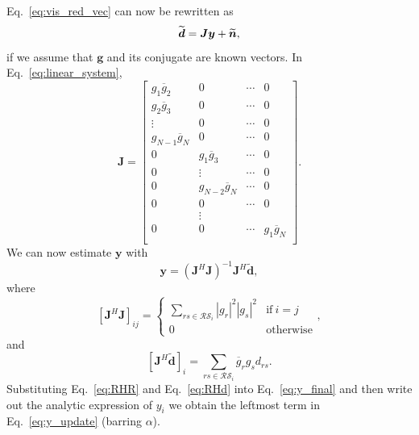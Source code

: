 \documentclass[useAMS,usenatbib]{mn2e}
\newcommand{\bn}{\bmath{n}}
\newcommand{\conj}[1]{\overline{#1}}
\begin{document}
Eq.~\eqref{eq:vis_red_vec} can now be rewritten as 
\begin{equation}
\label{eq:linear_system}
\widetilde{\boldsymbol{d}} = \boldsymbol{J}\boldsymbol{y} + \widetilde{\bn}, 
\end{equation}
if we assume that $\boldsymbol{g}$ and its conjugate are known vectors. In Eq.~\eqref{eq:linear_system},
\begin{equation}
\boldsymbol{J} = 
\begin{bmatrix}
g_1\conj{g}_2 & 0 & \cdots & 0\\
g_2\conj{g}_3 & 0 & \cdots & 0\\
\vdots & 0 & \cdots & 0\\
g_{N-1}\conj{g}_N & 0 & \cdots & 0\\
0 & g_1\conj{g}_3 & \cdots & 0\\
0 & \vdots & \cdots & 0\\
0 & g_{N-2}\conj{g}_N & \cdots & 0\\
0 & 0 & \cdots & 0\\
  & \vdots & \\
0 & 0 & \cdots & g_1\conj{g}_N\\  
\end{bmatrix}.
\end{equation}
We can now estimate $\boldsymbol{y}$ with
\begin{equation}
\label{eq:y_final}
\boldsymbol{y} = (\boldsymbol{J}^H\boldsymbol{J})^{-1}\boldsymbol{J}^H\widetilde{\boldsymbol{d}}, 
\end{equation}
where 
\begin{equation}
\label{eq:RHR}
[\boldsymbol{J}^H\boldsymbol{J}]_{ij} = 
\begin{cases}
\sum_{rs\in\mathcal{RS}_i} |g_r|^2|g_s|^2 &\textrm{if}~i=j\\
0&\textrm{otherwise}
\end{cases},
\end{equation}
and
\begin{equation}
\label{eq:RHd}
[\boldsymbol{J}^H\widetilde{\boldsymbol{d}}]_i = \sum_{rs\in\mathcal{RS}_i} \conj{g}_r g_s d_{rs}. 
\end{equation}
Substituting Eq.~\eqref{eq:RHR} and Eq.~\eqref{eq:RHd} into Eq.~\eqref{eq:y_final} and then write out the analytic expression of $y_i$ we obtain
the leftmost term in Eq.~\eqref{eq:y_update} (barring $\alpha$).
\label{lastpage}
\end{document}
